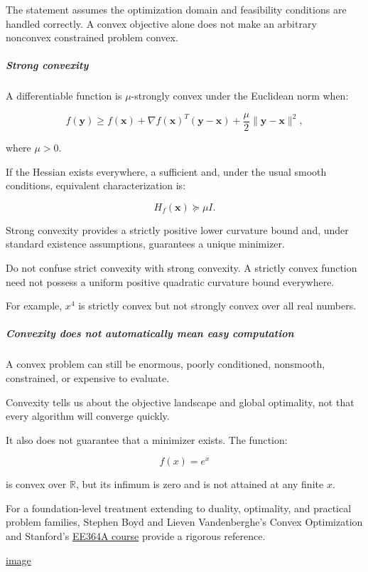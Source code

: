 The statement assumes the optimization domain and feasibility conditions are handled correctly. A convex objective alone does not make an arbitrary nonconvex constrained problem convex.

\subparagraph{Strong convexity}\label{strong-convexity}

A differentiable function is \(\mu\)-strongly convex under the Euclidean norm when:

\[
f(\mathbf y)\ge f(\mathbf x)+ \nabla f(\mathbf x)^T(\mathbf y-\mathbf x) +\frac\mu2\|\mathbf y-\mathbf x\|^2,
\]

where \(\mu>0\).

If the Hessian exists everywhere, a sufficient and, under the usual smooth conditions, equivalent characterization is:

\[
H_f(\mathbf x)\succeq\mu I.
\]

Strong convexity provides a strictly positive lower curvature bound and, under standard existence assumptions, guarantees a unique minimizer.

Do not confuse strict convexity with strong convexity. A strictly convex function need not possess a uniform positive quadratic curvature bound everywhere.

For example, \(x^4\) is strictly convex but not strongly convex over all real numbers.

\subparagraph{Convexity does not automatically mean easy computation}\label{convexity-does-not-automatically-mean-easy-computation}

A convex problem can still be enormous, poorly conditioned, nonsmooth, constrained, or expensive to evaluate.

Convexity tells us about the objective landscape and global optimality, not that every algorithm will converge quickly.

It also does not guarantee that a minimizer exists. The function:

\[
f(x)=e^x
\]

is convex over \(\mathbb R\), but its infimum is zero and is not attained at any finite \(x\).

For a foundation-level treatment extending to duality, optimality, and practical problem families, Stephen Boyd and Lieven Vandenberghe's Convex Optimization and Stanford's \href{https://web.stanford.edu/class/ee364a/?utm_source=chatgpt.com}{EE364A course} provide a rigorous reference. 

\href{https://www.google.com/s2/favicons?domain=https://stanford.edu&sz=32}{image}

